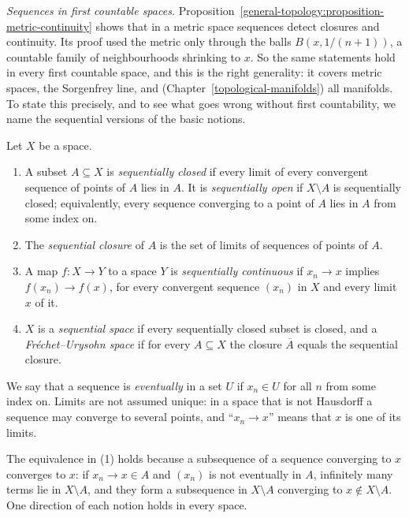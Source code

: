 \emph{Sequences in first countable spaces.} Proposition~\ref{general-topology:proposition-metric-continuity} shows that in a metric space sequences detect closures and continuity. Its proof used the metric only
through the balls $B(x, 1/(n+1))$, a countable family of neighbourhoods shrinking to $x$. So the same statements hold in every first countable space, and this is the right generality: it covers metric spaces,
the Sorgenfrey line, and (Chapter~\ref{topological-manifolds}) all manifolds. To state this precisely, and to see what goes wrong without first countability, we name the sequential versions of the basic notions.

\begin{definition}\label{general-topology:definition-sequential}
Let $X$ be a space.
\begin{enumerate}
\item A subset $A \subseteq X$ is \emph{sequentially closed} if every limit of every convergent sequence of points of $A$ lies in $A$. It is \emph{sequentially open} if $X \setminus A$ is sequentially closed; equivalently,
every sequence converging to a point of $A$ lies in $A$ from some index on.
\item The \emph{sequential closure} of $A$ is the set of limits of sequences of points of $A$.
\item A map $f \colon X \to Y$ to a space $Y$ is \emph{sequentially continuous} if $x_n \to x$ implies $f(x_n) \to f(x)$, for every convergent sequence $(x_n)$ in $X$ and every limit $x$ of it.
\item $X$ is a \emph{sequential space} if every sequentially closed subset is closed, and a \emph{Fr\'echet--Urysohn space} if for every $A \subseteq X$ the closure $\overline{A}$ equals the sequential closure.
\end{enumerate}
\end{definition}

\begin{notation}\label{general-topology:notation-sequential}
We say that a sequence is \emph{eventually} in a set $U$ if $x_n \in U$ for all $n$ from some index on. Limits are not assumed unique: in a space that is not Hausdorff a sequence may converge to several points, and
``$x_n \to x$'' means that $x$ is one of its limits.
\end{notation}

The equivalence in (1) holds because a subsequence of a sequence converging to $x$ converges to $x$: if $x_n \to x \in A$ and $(x_n)$ is not eventually in $A$, infinitely many terms lie in $X \setminus A$, and they form a
subsequence in $X \setminus A$ converging to $x \notin X \setminus A$. One direction of each notion holds in every space.

